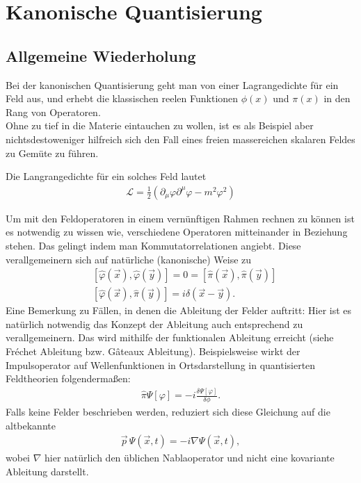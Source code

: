 \documentclass{scrartcl}
\begin{document}
	\section{Kanonische Quantisierung}
	\subsection{Allgemeine Wiederholung}
		Bei der kanonischen Quantisierung geht man von einer Lagrangedichte für ein 
		Feld aus, und erhebt die klassischen reelen Funktionen $\phi(x)$ und $\pi(x)$ in
		den Rang von Operatoren.\\
		Ohne zu tief in die Materie eintauchen zu wollen, ist es als Beispiel aber nichtsdestoweniger
		hilfreich sich den Fall eines freien massereichen skalaren Feldes zu Gemüte zu führen.
		
		Die Langrangedichte für ein solches Feld lautet
		\begin{align}
			\mathcal{L}=\frac{1}{2}(\partial_\mu\varphi \partial^\mu\varphi-m^2\varphi^2)
		\end{align}
		
		Um mit den Feldoperatoren in einem vernünftigen Rahmen rechnen zu können
		ist es notwendig zu wissen wie, verschiedene Operatoren mitteinander in 
		Beziehung stehen. Das gelingt indem man Kommutatorrelationen angiebt.
		Diese verallgemeinern sich auf natürliche (kanonische) Weise zu
		\begin{align}
			&[\hat{\varphi}(\vec{x}), \hat{\varphi}(\vec{y})]=0=[\hat{\pi}(\vec{x}), \hat{\pi}(\vec{y})] \\
			&[\hat{\varphi}(\vec{x}), \hat{\pi}(\vec{y})]=i\delta(\vec{x}-\vec{y}).
		\end{align}
		Eine Bemerkung zu Fällen, in denen die Ableitung der Felder auftritt:
		Hier ist es natürlich notwendig das Konzept der Ableitung auch entsprechend
		zu verallgemeinern. Das wird mithilfe der funktionalen Ableitung erreicht
		(siehe Fr\'echet Ableitung bzw. G\^ateaux Ableitung).
		Beispielsweise wirkt der Impulsoperator auf Wellenfunktionen in Ortsdarstellung in quantisierten Feldtheorien folgendermaßen:
		\begin{align*}
			\hat{\pi}\Psi[\varphi]=-i\frac{\delta\Psi[\varphi]}{\delta \phi}.
		\end{align*}
		Falls keine Felder beschrieben werden, reduziert sich diese Gleichung auf die altbekannte
		\begin{align*}
			\vec{p}\, \Psi(\vec{x},t)=-i\nabla \Psi(\vec{x},t),
		\end{align*}
		wobei $\nabla$ hier natürlich den üblichen Nablaoperator und nicht eine kovariante Ableitung darstellt.
\end{document}
